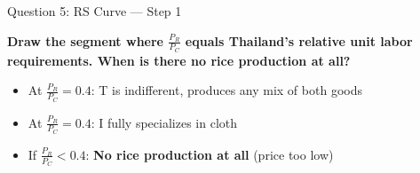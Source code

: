 \documentclass{beamer}
\begin{document}
\begin{frame}{Question 5: RS Curve --- Step 1}

\textbf{Draw the segment where $\frac{P_R}{P_C}$ equals Thailand's relative unit labor requirements. When is there no rice production at all?}

\vspace{0.1cm}

\centering
{}

\begin{itemize}
    \item At $\frac{P_R}{P_C} = 0.4$: T is indifferent, produces any mix of both goods
    \item At $\frac{P_R}{P_C} = 0.4$: I fully specializes in cloth
    \item If $\frac{P_R}{P_C} < 0.4$: \textbf{No rice production at all} (price too low)
\end{itemize}

\end{frame}

\end{document}
